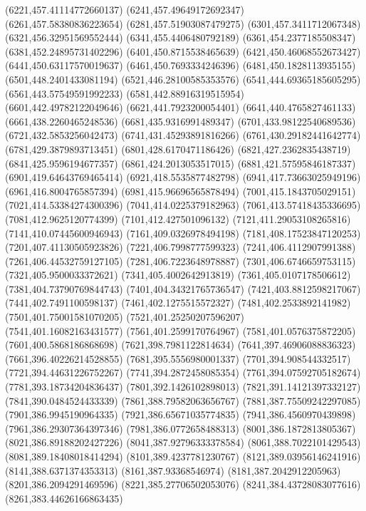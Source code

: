 {(6221,457.41114772660137)
(6241,457.49649172692347)
(6261,457.58380836223654)
(6281,457.51903087479275)
(6301,457.3411712067348)
(6321,456.32951569552444)
(6341,455.4406480792189)
(6361,454.2377185508347)
(6381,452.24895731402296)
(6401,450.8715538465639)
(6421,450.46068552673427)
(6441,450.63117570019637)
(6461,450.7693334246396)
(6481,450.1828113935155)
(6501,448.2401433081194)
(6521,446.28100585353576)
(6541,444.69365185605295)
(6561,443.57549591992233)
(6581,442.88916319515954)
(6601,442.49782122049646)
(6621,441.7923200054401)
(6641,440.4765827461133)
(6661,438.2260465248536)
(6681,435.9316991489347)
(6701,433.98122540689536)
(6721,432.5853256042473)
(6741,431.45293891816266)
(6761,430.29182441642774)
(6781,429.3879893713451)
(6801,428.6170471186426)
(6821,427.2362835438719)
(6841,425.9596194677357)
(6861,424.2013053517015)
(6881,421.57595846187337)
(6901,419.64643769465414)
(6921,418.5535877482798)
(6941,417.73663025949196)
(6961,416.8004765857394)
(6981,415.96696565878494)
(7001,415.1843705029151)
(7021,414.53384274300396)
(7041,414.0225379182963)
(7061,413.57418435336695)
(7081,412.9625120774399)
(7101,412.427501096132)
(7121,411.29053108265816)
(7141,410.07445600946943)
(7161,409.0326978494198)
(7181,408.17523847120253)
(7201,407.41130505923826)
(7221,406.7998777599323)
(7241,406.4112907991388)
(7261,406.44532759127105)
(7281,406.7223648978887)
(7301,406.6746659753115)
(7321,405.9500033372621)
(7341,405.4002642913819)
(7361,405.0107178506612)
(7381,404.73790769844743)
(7401,404.34321765736547)
(7421,403.8812598217067)
(7441,402.7491100598137)
(7461,402.1275515572327)
(7481,402.2533892141982)
(7501,401.75001581070205)
(7521,401.25250207596207)
(7541,401.16082163431577)
(7561,401.2599170764967)
(7581,401.0576375872205)
(7601,400.5868186868698)
(7621,398.7981122814634)
(7641,397.46906088836323)
(7661,396.40226214528855)
(7681,395.5556980001337)
(7701,394.908544332517)
(7721,394.44631226752267)
(7741,394.2872458085354)
(7761,394.07592705182674)
(7781,393.18734204836437)
(7801,392.1426102898013)
(7821,391.14121397332127)
(7841,390.0484524433339)
(7861,388.79582063656767)
(7881,387.75509242297085)
(7901,386.9945190964335)
(7921,386.65671035774835)
(7941,386.4560970439898)
(7961,386.29307364397346)
(7981,386.0772658488313)
(8001,386.1872813805367)
(8021,386.89188202427226)
(8041,387.92796333378584)
(8061,388.7022101429543)
(8081,389.18408018414294)
(8101,389.4237781230767)
(8121,389.03956146241916)
(8141,388.6371374353313)
(8161,387.93368546974)
(8181,387.2042912205963)
(8201,386.2094291469596)
(8221,385.27706502053076)
(8241,384.43728083077616)
(8261,383.44626166863435)
}

